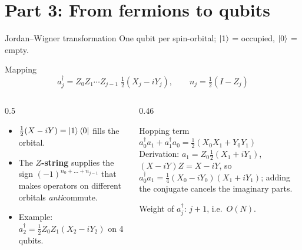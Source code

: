 \documentclass[aspectratio=169,11pt]{beamer}
\newcommand{\key}[1]{{\color{qdark}\textbf{#1}}}
\begin{document}
\section{Part 3: From fermions to qubits}
\begin{frame}{Jordan--Wigner transformation}
  One qubit per spin-orbital; $\ket1$ = occupied, $\ket0$ = empty.
  \begin{block}{Mapping}
    \[ a_j^\dagger = Z_0Z_1\cdots Z_{j-1}\;\tfrac12(X_j - iY_j), \qquad n_j = \tfrac12(I - Z_j) \]
  \end{block}
  \begin{columns}[T]
    \begin{column}{0.5\textwidth}
      \begin{itemize}
        \item $\tfrac12(X - iY) = \ket1\bra0$ fills the orbital.
        \item The \key{$Z$-string} supplies the sign $(-1)^{n_0 + \dots + n_{j-1}}$ that makes operators on different orbitals \emph{anti}commute.
        \item Example: $a_2^\dagger = \tfrac12 Z_0Z_1(X_2 - iY_2)$ on 4 qubits.
      \end{itemize}
    \end{column}
    \begin{column}{0.46\textwidth}
      \begin{exampleblock}{Hopping term}
        $a_0^\dagger a_1 + a_1^\dagger a_0 = \tfrac12(X_0X_1 + Y_0Y_1)$\\[1mm]
        Derivation: $a_1 = Z_0\tfrac12(X_1 + iY_1)$, $(X - iY)Z = X - iY$, so $a_0^\dagger a_1 = \tfrac14(X_0 - iY_0)(X_1 + iY_1)$; adding the
        conjugate cancels the imaginary parts.
      \end{exampleblock}
      \small Weight of $a_j^\dagger$: $j + 1$, i.e.\ $O(N)$.
    \end{column}
  \end{columns}
\end{frame}
\end{document}
